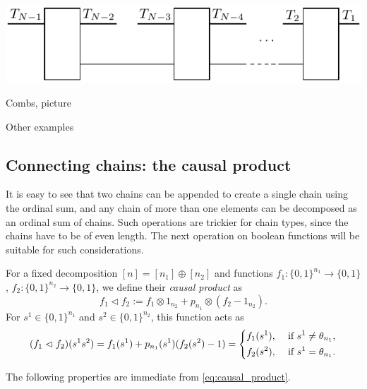 \documentclass[12pt]{article}
\theoremstyle{definition}
\theoremstyle{remark}
\newtheorem{remark}{Remark}
\def\vtl{\vartriangleleft}
\begin{document}
\begin{center}
\includegraphics[scale=0.9]{general_comb_T.t1.pdf}
\end{center}


Combs, picture

Other examples



\subsection{Connecting chains: the causal product}



It is easy to see that two chains can be appended to create a single chain using the
ordinal sum, and any chain
of more than one elements can be decomposed as an ordinal sum of  chains. Such operations are trickier for
chain types, since the chains have to be of even length. The next operation on boolean
functions will be suitable for such considerations. 
 
For a fixed decomposition $[n]=[n_1]\oplus[n_2]$ and functions
$f_1:\{0,1\}^{n_1}\to \{0,1\}$, $f_2:\{0,1\}^{n_2}\to \{0,1\}$, we define their {\em
causal product} as 
\[
f_1\vartriangleleft f_2:=f_1\otimes 1_{n_2}+p_{n_1}\otimes (f_2-1_{n_2}).
\]
For  $s^1\in \{0,1\}^{n_1}$ and $s^2\in \{0,1\}^{n_2}$, this function acts as
\begin{equation}\label{eq:causal_product}
(f_1\vtl f_2)(s^1s^2)= f_1(s^1)+p_{n_1}(s^1)(f_2(s^2)-1)=\begin{dcases} f_1(s^1), &
\text{ if } s^1\ne \theta_{n_1},\\
   f_2(s^2), & \text{ if } s^1=\theta_{n_1}.
   \end{dcases}
\end{equation}

%
%
%
The following properties are immediate from \eqref{eq:causal_product}. 
\end{document}

